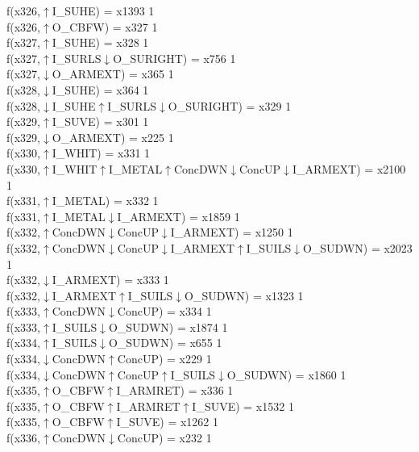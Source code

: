 f(x326,$\uparrow$I\_SUHE) = x1393 {1} \\
f(x326,$\uparrow$O\_CBFW) = x327 {1} \\
f(x327,$\uparrow$I\_SUHE) = x328 {1} \\
f(x327,$\uparrow$I\_SURLS$\downarrow$O\_SURIGHT) = x756 {1} \\
f(x327,$\downarrow$O\_ARMEXT) = x365 {1} \\
f(x328,$\downarrow$I\_SUHE) = x364 {1} \\
f(x328,$\downarrow$I\_SUHE$\uparrow$I\_SURLS$\downarrow$O\_SURIGHT) = x329 {1} \\
f(x329,$\uparrow$I\_SUVE) = x301 {1} \\
f(x329,$\downarrow$O\_ARMEXT) = x225 {1} \\
f(x330,$\uparrow$I\_WHIT) = x331 {1} \\
f(x330,$\uparrow$I\_WHIT$\uparrow$I\_METAL$\uparrow$ConcDWN$\downarrow$ConcUP$\downarrow$I\_ARMEXT) = x2100 {1} \\
f(x331,$\uparrow$I\_METAL) = x332 {1} \\
f(x331,$\uparrow$I\_METAL$\downarrow$I\_ARMEXT) = x1859 {1} \\
f(x332,$\uparrow$ConcDWN$\downarrow$ConcUP$\downarrow$I\_ARMEXT) = x1250 {1} \\
f(x332,$\uparrow$ConcDWN$\downarrow$ConcUP$\downarrow$I\_ARMEXT$\uparrow$I\_SUILS$\downarrow$O\_SUDWN) = x2023 {1} \\
f(x332,$\downarrow$I\_ARMEXT) = x333 {1} \\
f(x332,$\downarrow$I\_ARMEXT$\uparrow$I\_SUILS$\downarrow$O\_SUDWN) = x1323 {1} \\
f(x333,$\uparrow$ConcDWN$\downarrow$ConcUP) = x334 {1} \\
f(x333,$\uparrow$I\_SUILS$\downarrow$O\_SUDWN) = x1874 {1} \\
f(x334,$\uparrow$I\_SUILS$\downarrow$O\_SUDWN) = x655 {1} \\
f(x334,$\downarrow$ConcDWN$\uparrow$ConcUP) = x229 {1} \\
f(x334,$\downarrow$ConcDWN$\uparrow$ConcUP$\uparrow$I\_SUILS$\downarrow$O\_SUDWN) = x1860 {1} \\
f(x335,$\uparrow$O\_CBFW$\uparrow$I\_ARMRET) = x336 {1} \\
f(x335,$\uparrow$O\_CBFW$\uparrow$I\_ARMRET$\uparrow$I\_SUVE) = x1532 {1} \\
f(x335,$\uparrow$O\_CBFW$\uparrow$I\_SUVE) = x1262 {1} \\
f(x336,$\uparrow$ConcDWN$\downarrow$ConcUP) = x232 {1} \\
